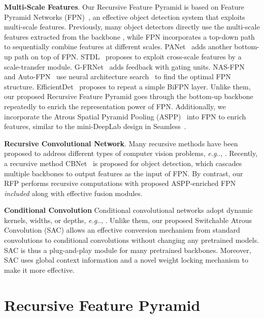 \documentclass[final]{cvpr}
\makeatletter
\def\@onedot{\ifx\@let@token.\else.\null\fi\xspace}
\DeclareRobustCommand\onedot{\futurelet\@let@token\@onedot}
\def\eg{\emph{e.g}\onedot} \def\Eg{\emph{E.g}\onedot}
\makeatother
\begin{document}
\noindent\textbf{Multi-Scale Features}.
Our Recursive Feature Pyramid is based on Feature Pyramid Networks (FPN)~\cite{fpn}, an effective object detection system that exploits multi-scale features.
Previously, many object detectors directly use the multi-scale features extracted from the backbone \cite{liu2016ssd,cai2016unified}, while FPN incorporates a top-down path to sequentially combine features at different scales. PANet~\cite{panet} adds another bottom-up path on top of FPN. STDL~\cite{zhou2018scale} proposes to exploit cross-scale features by a scale-transfer module.
G-FRNet~\cite{amirul2017gated} adds feedback with gating units.
NAS-FPN~\cite{nasfpn} and Auto-FPN~\cite{xu2019auto} use neural architecture search~\cite{zoph2016neural} to find the optimal FPN structure.
EfficientDet~\cite{efficientdet} proposes to repeat a simple BiFPN layer.
Unlike them, our proposed Recursive Feature Pyramid goes through the bottom-up backbone repeatedly to enrich the representation power of FPN.
Additionally, we incorporate the Atrous Spatial Pyramid Pooling (ASPP)~\cite{chen2017deeplabv3,deeplabv3plus2018} into FPN to enrich features, similar to the mini-DeepLab design in Seamless~\cite{porzi2019seamless}.

\noindent\textbf{Recursive Convolutional Network}.
Many recursive methods have been proposed to address different types of computer vision problems, \eg, \cite{liang2015recurrent,kim2016deeply,tai2017image}.
Recently, a recursive method CBNet~\cite{liu2019cbnet} is proposed for object detection, which cascades multiple backbones to output features as the input of FPN.
By contrast, our RFP performs recursive computations with proposed ASPP-enriched FPN {\it included} along with effective fusion modules.

\noindent\textbf{Conditional Convolution}
Conditional convolutional networks adopt dynamic kernels, widths, or depths, \eg, \cite{lin2017runtime,liu2018dynamic,yu2018slimmable,li2019selective,chen2019dynamic,condconv}.
Unlike them, our proposed Switchable Atrous Convolution (SAC) allows an effective conversion mechanism from standard convolutions to conditional convolutions without changing any pretrained models.
SAC is thus a plug-and-play module for many pretrained backbones.
Moreover, SAC uses global context information and a novel weight locking mechanism to make it more effective.
 \section{Recursive Feature Pyramid}\label{sec:rfp}
\end{document}
